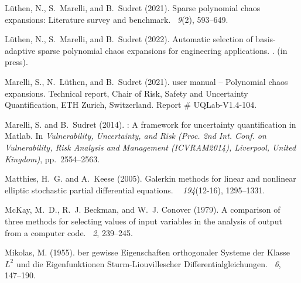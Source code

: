 \documentclass[a4paper,11pt]{article}
\theoremstyle{definition}
\theoremstyle{remark}
\theoremstyle{theorem}
\begin{document}
\begin{thebibliography}{}
	L\"uthen, N., S.~Marelli, and B.~Sudret (2021).
	\newblock Sparse polynomial chaos expansions: {L}iterature survey and
	benchmark.
	~{\em 9\/}(2),
	593--649.
	
	L\"uthen, N., S.~Marelli, and B.~Sudret (2022).
	\newblock Automatic selection of basis-adaptive sparse polynomial chaos
	expansions for engineering applications.
	.
	\newblock (in press).
	
	Marelli, S., N.~L\"uthen, and B.~Sudret (2021).
	 user manual -- {P}olynomial chaos expansions.
	\newblock Technical report, Chair of Risk, Safety and Uncertainty
	Quantification, ETH Zurich, Switzerland.
	\newblock Report \# UQLab-V1.4-104.
	
	Marelli, S. and B.~Sudret (2014).
	: A framework for uncertainty quantification in {Matlab}.
	\newblock In {\em Vulnerability, Uncertainty, and Risk (Proc. 2nd Int. Conf. on
		Vulnerability, Risk Analysis and Management {(ICVRAM2014)}, Liverpool, United
		Kingdom)}, pp.\  2554--2563.
	
	Matthies, H.~G. and A.~Keese (2005).
	\newblock Galerkin methods for linear and nonlinear elliptic stochastic partial
	differential equations.
	~{\em
		194\/}(12-16), 1295--1331.
	
	McKay, M.~D., R.~J. Beckman, and W.~J. Conover (1979).
	\newblock A comparison of three methods for selecting values of input variables
	in the analysis of output from a computer code.
	~{\em 2}, 239--245.
	
	Mikolas, M. (1955).
	ber gewisse {E}igenschaften orthogonaler {S}ysteme der {K}lasse
	${L}^2$ und die {E}igenfunktionen {S}turm-{L}iouvillescher
	{D}ifferentialgleichungen.
	~{\em 6},
	147--190.
	

\end{thebibliography}
\end{document}
